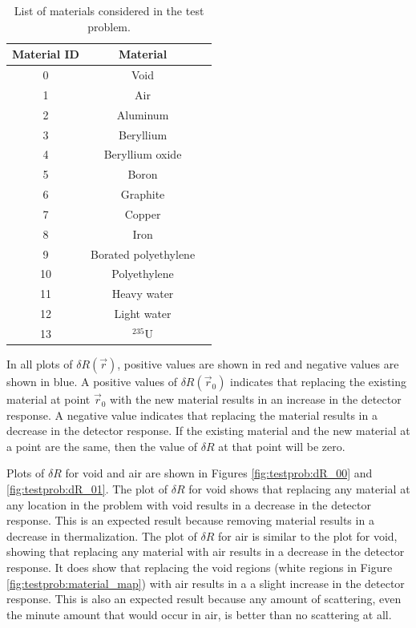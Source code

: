 \begin{table}[h]
  \centering
  \caption{List of materials considered in the test problem.}
  \label{tab:testprob:material_list}
  \begin{tabular}{| c | c | c |}
    \hline
    \textbf{Material ID} & \textbf{Material} \\ \hline
     0 & Void                 \\ \hline
     1 & Air                  \\ \hline
     2 & Aluminum             \\ \hline
     3 & Beryllium            \\ \hline
     4 & Beryllium oxide      \\ \hline
     5 & Boron                \\ \hline
     6 & Graphite             \\ \hline
     7 & Copper               \\ \hline
     8 & Iron                 \\ \hline
     9 & Borated polyethylene \\ \hline
    10 & Polyethylene         \\ \hline
    11 & Heavy water          \\ \hline
    12 & Light water          \\ \hline
    13 & ${}^{235}\text{U}$   \\ \hline
  \end{tabular}
\end{table}

In all plots of $\delta R\left(\vec{r}\right)$, positive values are shown in red and negative values are shown in blue.
A positive values of $\delta R\left(\vec{r}_0\right)$ indicates that replacing the existing material at point $\vec{r}_0$ with the new material results in an increase in the detector response.
A negative value indicates that replacing the material results in a decrease in the detector response.
If the existing material and the new material at a point are the same, then the value of $\delta R$ at that point will be zero.

Plots of $\delta R$ for void and air are shown in Figures \ref{fig:testprob:dR_00} and \ref{fig:testprob:dR_01}.
The plot of $\delta R$ for void shows that replacing any material at any location in the problem with void results in a decrease in the detector response.
This is an expected result because removing material results in a decrease in thermalization.
The plot of $\delta R$ for air is similar to the plot for void, showing that replacing any material with air results in a decrease in the detector response.
It does show that replacing the void regions (white regions in Figure \ref{fig:testprob:material_map}) with air results in a a slight increase in the detector response.
This is also an expected result because any amount of scattering, even the minute amount that would occur in air, is better than no scattering at all.

